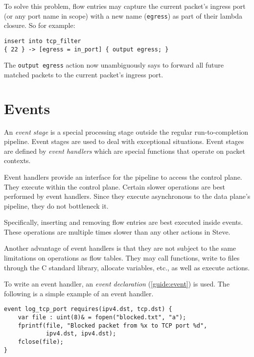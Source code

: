 To solve this problem, flow entries may capture the current packet's ingress
port (or any port name in scope) with a new name (\texttt{egress}) as part of 
their lambda closure. So for example:

\begin{codepage}
\begin{lstlisting}
insert into tcp_filter
{ 22 } -> [egress = in_port] { output egress; }
\end{lstlisting}
\end{codepage}

The \texttt{output egress} action now unambiguously says to forward all future
matched packets to the current packet's ingress port.

\section{Events} \label{tut:event}

An \textit{event stage} is a special processing stage outside the regular
run-to-completion pipeline. Event stages are used to deal with exceptional
situations. Event stages are defined by \textit{event handlers} which are special
functions that operate on packet contexts. 

Event handlers provide an interface for the pipeline to access the control
plane. They execute within the control plane. Certain slower operations
are best performed by event handlers. Since they execute asynchronous to the
data plane's pipeline, they do not bottleneck it.

Specifically, inserting and removing flow entries are best executed inside
events. These operations are multiple times slower
than any other actions in Steve.

Another advantage of event handlers is that they are not subject to the same
limitations on operations as flow tables. They may call functions,
write to files through the C standard library, allocate variables, etc., as
well as execute actions.

To write an event handler, an \textit{event declaration}
(\ref{guide:event}) is used. The following is a simple example
of an event handler.

\begin{codepage}
\begin{lstlisting}
event log_tcp_port requires(ipv4.dst, tcp.dst) {
	var file : uint(8)& = fopen("blocked.txt", "a");
	fprintf(file, "Blocked packet from %x to TCP port %d", 
			ipv4.dst, ipv4.dst);
	fclose(file);
}
\end{lstlisting}
\end{codepage}

